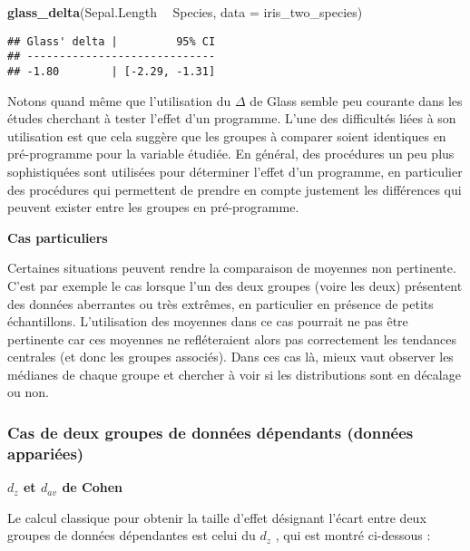 \documentclass[
  french,
]{book}
\newenvironment{Shaded}{\begin{snugshade}}{\end{snugshade}}
\newcommand{\DataTypeTok}[1]{\textcolor[rgb]{0.13,0.29,0.53}{#1}}
\newcommand{\KeywordTok}[1]{\textcolor[rgb]{0.13,0.29,0.53}{\textbf{#1}}}
\newcommand{\NormalTok}[1]{#1}
\newcommand{\OperatorTok}[1]{\textcolor[rgb]{0.81,0.36,0.00}{\textbf{#1}}}
\newcommand{\StringTok}[1]{\textcolor[rgb]{0.31,0.60,0.02}{#1}}
\begin{document}
\begin{Shaded}
\begin{Highlighting}[]
\KeywordTok{glass_delta}\NormalTok{(Sepal.Length }\OperatorTok{~}\StringTok{ }\NormalTok{Species, }
            \DataTypeTok{data =}\NormalTok{ iris_two_species)}
\end{Highlighting}
\end{Shaded}

\begin{verbatim}
## Glass' delta |         95% CI
## -----------------------------
## -1.80        | [-2.29, -1.31]
\end{verbatim}

Notons quand même que l'utilisation du \(\Delta\) de Glass semble peu courante dans les études cherchant à tester l'effet d'un programme. L'une des difficultés liées à son utilisation est que cela suggère que les groupes à comparer soient identiques en pré-programme pour la variable étudiée. En général, des procédures un peu plus sophistiquées sont utilisées pour déterminer l'effet d'un programme, en particulier des procédures qui permettent de prendre en compte justement les différences qui peuvent exister entre les groupes en pré-programme.

\textbf{Cas particuliers}

Certaines situations peuvent rendre la comparaison de moyennes non pertinente. C'est par exemple le cas lorsque l'un des deux groupes (voire les deux) présentent des données aberrantes ou très extrêmes, en particulier en présence de petits échantillons. L'utilisation des moyennes dans ce cas pourrait ne pas être pertinente car ces moyennes ne refléteraient alors pas correctement les tendances centrales (et donc les groupes associés). Dans ces cas là, mieux vaut observer les médianes de chaque groupe et chercher à voir si les distributions sont en décalage ou non.

\hypertarget{cas-de-deux-groupes-de-donnuxe9es-duxe9pendants-donnuxe9es-appariuxe9es}{%
\subsubsection{Cas de deux groupes de données dépendants (données appariées)}\label{cas-de-deux-groupes-de-donnuxe9es-duxe9pendants-donnuxe9es-appariuxe9es}}

\textbf{\(d_{z}\) et \(d_{av}\) de Cohen}

Le calcul classique pour obtenir la taille d'effet désignant l'écart entre deux groupes de données dépendantes est celui du \(d_{z}\) \autocite{lakensCalculatingReportingEffect2013}, qui est montré ci-dessous :
\end{document}
